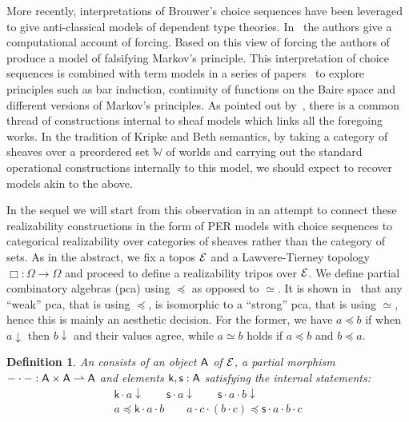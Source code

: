 \documentclass{easychair}
\newtheorem{defn}[thrm]{Definition}
\begin{document}
More recently, interpretations of Brouwer's choice sequences have been leveraged
to give anti-classical models of dependent type theories.
%
In~\cite{coquandComputationalInterpretationForcing2012} the authors give a
computational account of forcing.
%
Based on this view of forcing the authors
of~\cite{coquandIndependenceMarkovsPrinciple2017} produce a model of \MLTT{}
falsifying Markov's principle.
%
This interpretation of choice sequences is combined with term models in a series
of papers~\cite{bickfordComputabilityChurchTuringChoice2018,
  bickfordOpenBarBrouwerian2021, cohenSeparatingMarkovsPrinciples2024,
  rahliValidatingBrouwersContinuity2018, forsterMarkovsPrinciplesConstructive}
to explore principles such as bar induction, continuity of functions on the
Baire space and different versions of Markov's principles.
%
As pointed out by~\cite{sterlingHigherOrderFunctions2021}, there is a common
thread of constructions internal to sheaf models which links all the foregoing
works.
%
In the tradition of Kripke and Beth semantics, by taking a category of
sheaves over a preordered set \(\mathbb{W}\) of worlds and carrying out
the standard operational constructions internally to this model, we should
expect to recover models akin to the above.

In the sequel we will start from this observation in an attempt to connect these
realizability constructions in the form of PER models with choice sequences to
categorical realizability over categories of sheaves rather than the category of
sets.
%
As in the abstract, we fix a topos \(\mathcal{E}\) and a Lawvere-Tierney topology
\(\Box : \Omega \to \Omega\) and proceed to define a realizability tripos over
\(\mathcal{E}\).
%
We define partial combinatory algebras (pca) using \(\preccurlyeq\) as opposed
to \(\simeq\).
%
It is shown in~\cite{faberEffectiveOperationsType2016} that any
``weak'' pca, that is using \(\preccurlyeq\), is isomorphic to a ``strong'' pca,
that is using \(\simeq\), hence this is mainly an aesthetic decision.
%
For the former, we have \(a \preccurlyeq b\) if when \(a \downarrow\) then
\(b \downarrow\) and their values agree, while \(a \simeq b\) holds if
\(a \preccurlyeq b\) and \(b \preccurlyeq a\).

\begin{defn}
  An  consists of
  an object \(\mathsf{A}\) of \(\mathcal{E}\), a partial morphism
  \(-\cdot-:\mathsf{A} \times \mathsf{A} \rightharpoonup \mathsf{A}\) and elements
  \(\mathsf{k},\mathsf{s} : \mathsf{A}\) satisfying the internal
  statements:
  \[\begin{array}{c}
      \mathsf{k} \cdot a \downarrow \qquad
      \mathsf{s} \cdot a \downarrow \qquad
      \mathsf{s} \cdot a \cdot b \downarrow \\
      a \preccurlyeq \mathsf{k} \cdot a \cdot b \qquad
      a \cdot c \cdot (b \cdot c) \preccurlyeq \mathsf{s} \cdot a \cdot b \cdot c
  \end{array}\]
\end{defn}
\end{document}
